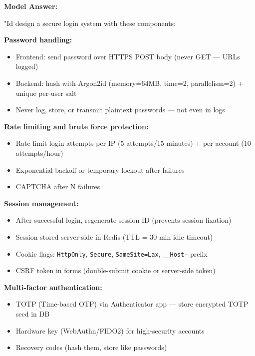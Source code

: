 \documentclass[11pt]{article}
\providecommand{\tightlist}{\setlength{\itemsep}{1pt}\setlength{\parskip}{0pt}}
\begin{document}
\textbf{Model Answer:}

"I\textquotesingle d design a secure login system with these components:

\textbf{Password handling:}

\begin{itemize}
\tightlist
\item
  Frontend: send password over HTTPS POST body (never GET --- URLs logged)
\item
  Backend: hash with Argon2id (memory=64MB, time=2, parallelism=2) + unique per-user salt
\item
  Never log, store, or transmit plaintext passwords --- not even in logs
\end{itemize}

\textbf{Rate limiting and brute force protection:}

\begin{itemize}
\tightlist
\item
  Rate limit login attempts per IP (5 attempts/15 minutes) + per account (10 attempts/hour)
\item
  Exponential backoff or temporary lockout after failures
\item
  CAPTCHA after N failures
\end{itemize}

\textbf{Session management:}

\begin{itemize}
\tightlist
\item
  After successful login, regenerate session ID (prevents session fixation)
\item
  Session stored server-side in Redis (TTL = 30 min idle timeout)
\item
  Cookie flags: \texttt{HttpOnly}, \texttt{Secure}, \texttt{SameSite=Lax}, \texttt{\_\_Host-} prefix
\item
  CSRF token in forms (double-submit cookie or server-side token)
\end{itemize}

\textbf{Multi-factor authentication:}

\begin{itemize}
\tightlist
\item
  TOTP (Time-based OTP) via Authenticator app --- store encrypted TOTP seed in DB
\item
  Hardware key (WebAuthn/FIDO2) for high-security accounts
\item
  Recovery codes (hash them, store like passwords)
\end{itemize}
\end{document}
